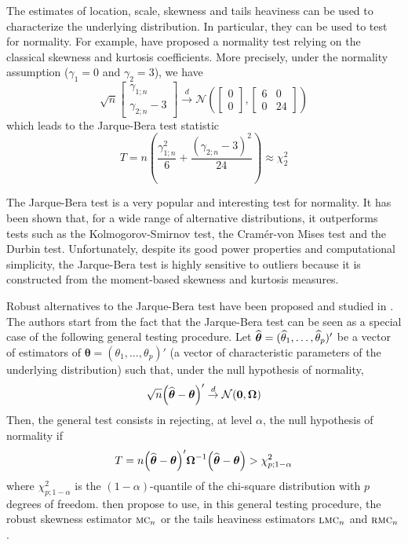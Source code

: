 The estimates of location, scale, skewness and tails heaviness can be used to
characterize the underlying distribution. In particular, they can be used to
test for normality. For example, \citet{Jarque:Bera:1980} have proposed a
normality test relying on the classical skewness and kurtosis coefficients.
More precisely, under the normality assumption ($\gamma_1=0$ and $\gamma_2=3$),
we have
\[ 
    \sqrt{n}
    \begin{bmatrix}
        \gamma_{1;n} \\
        \gamma_{2;n} - 3
    \end{bmatrix}
    \stackrel{d}{\rightarrow}
    \mathcal{N}\left(
    \begin{bmatrix}
        0 \\
        0
    \end{bmatrix},
    \begin{bmatrix}
        6 & 0\\
        0 & 24
    \end{bmatrix}
    \right)
\]
which leads to the Jarque-Bera test statistic
\[
    T = n \left(\frac{\gamma_{1;n}^2}{6} + 
          \frac{\left(\gamma_{2;n} - 3\right)^2}{24}\right)
    \approx \chi_2^2
\]

The Jarque-Bera test is a very popular and interesting test for normality. It
has been shown that, for a wide range of alternative distributions, it
outperforms tests such as the Kolmogorov-Smirnov test, the Cramér-von Mises
test and the Durbin test. Unfortunately, despite its good power properties and
computational simplicity, the Jarque-Bera test is highly sensitive to outliers
because it is constructed from the moment-based skewness and kurtosis measures.

Robust alternatives to the Jarque-Bera test have been proposed and studied in
\citet{brys:etal:2004b}. The authors start from the fact that the Jarque-Bera
test can be seen as a special case of the following general testing procedure.
Let $\widehat{\boldsymbol\theta} = (\widehat{\theta}_1, \dots, \widehat{\theta}_p)'$
be a vector of estimators of $\boldsymbol\theta = (\theta_1, \dots, \theta_p)'$
(a vector of characteristic parameters of the underlying distribution) such
that, under the null hypothesis of normality,
\[
    \sqrt{n} \left(\sthat{\boldsymbol\theta} - \boldsymbol{\theta}\right)'
    \stackrel{d}{\rightarrow}
    \mathcal{N}(\stvec{0},\boldsymbol\Omega)
\]
Then, the general test consists in rejecting, at level $\alpha$, the null
hypothesis of normality if
\[
    T = n\left(\sthat{\boldsymbol\theta} - \boldsymbol\theta\right)'
    \boldsymbol\Omega^{-1}
    \left(\sthat{\boldsymbol\theta} - \boldsymbol\theta\right)
    > \chi_{p;1-\alpha}^2
\]
where $\chi_{p;1-\alpha}^2$ is the $(1-\alpha)$-quantile of the chi-square
distribution with $p$ degrees of freedom. \citet{brys:etal:2004b} then propose
to use, in this general testing procedure, the robust skewness estimator
$\stsc{MC}_n$ or the tails heaviness estimators $\stsc{LMC}_n$ and
$\stsc{RMC}_n$.

